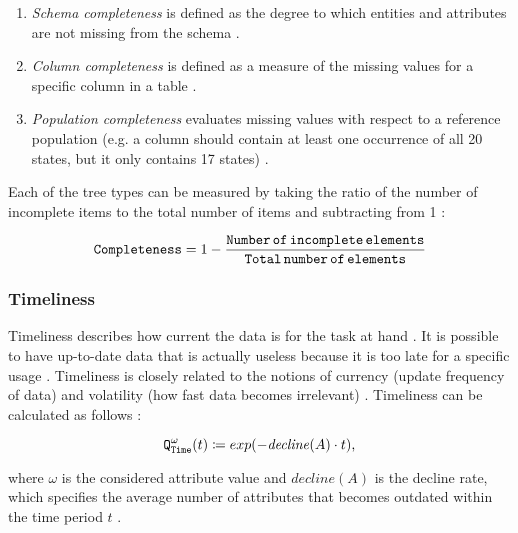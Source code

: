 					\begin{enumerate}
						\item \emph{Schema completeness} is defined as the degree to which entities and attributes are not missing from the schema \cite{Batini2006}\cite{Pipino2002}.
						\item \emph{Column completeness} is defined as a measure of the missing values for a specific column in a table \cite{Batini2006}\cite{Pipino2002}.
						\item \emph{Population completeness} evaluates missing values with respect to a reference population (e.g. a column should contain at least one occurrence of all 20 states, but it only contains 17 states) \cite{Batini2006}\cite{Pipino2002}.
					\end{enumerate}					 
					
					Each of the tree types can be measured by taking the ratio of the number of incomplete items to the total number of items and subtracting from 1 \cite{Pipino2002}:
					
					\begin{equation}
					\label{eqn:completeness}
					{\operatorname{\mathtt{Completeness}}} = 1 - \frac{{\operatorname{\mathtt{Number}}}\,{\operatorname{\mathtt{of}}}\,{\operatorname{\mathtt{incomplete}}}\,{\operatorname{\mathtt{elements}}}}{{\operatorname{\mathtt{Total}}}\,{\operatorname{\mathtt{number}}}\,{\operatorname{\mathtt{of}}}\,{\operatorname{\mathtt{elements}}}}
					\end{equation} 				
				
				\subsubsection{Timeliness}
				\label{subsec:timeliness}
			
					Timeliness describes how current the data is for the task at hand \cite{Batini2006}. It is possible to have up-to-date data that is actually useless because it is too late for a specific usage \cite{Batini2006}. Timeliness is closely related to the notions of currency (update frequency of data) and volatility (how fast data becomes irrelevant) \cite{Ehrlinger2019}. Timeliness can be calculated as follows \cite{Ehrlinger2019}:	
			
					\begin{equation}
					\label{eqn:timeliness}
					{\operatorname{\mathtt{Q}}}_{\operatorname{\mathtt{Time}}}^\omega (t) \coloneqq exp(-\mathit{decline}(A) \cdot t)\text{,}
					\end{equation} 	
			
where $\omega$ is the considered attribute value and $\mathit{decline}(A)$ is the decline rate, which specifies the average number of attributes that becomes outdated within the time period $t$ \cite{Ehrlinger2019}.

